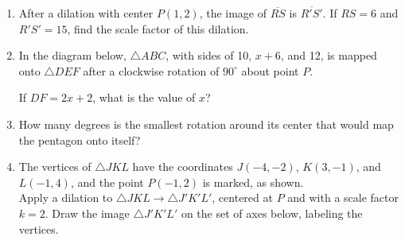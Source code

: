 \documentclass[12pt, twoside]{article}
\begin{document}
\begin{enumerate}
  \item After a dilation with center $P(1,2)$, the image of $\overline{RS}$ is $\overline{R'S'}$. If $RS=6$ and $R'S'=15$, find the scale factor of this dilation. \vspace{3cm}


  \item In the diagram below, $\triangle ABC$, with sides of 10, $x+6$, and 12, is mapped onto $\triangle DEF$ after a clockwise rotation of $90^\circ$ about point $P$.
      \begin{center}
      \end{center}
    If $DF=2x+2$, what is the value of $x$? \vspace{3cm}


     \item How many degrees is the smallest rotation around its center that would map the pentagon onto itself?
       \begin{center}
         \end{center}

\newpage
    \item The vertices of $\triangle JKL$ have the coordinates $J(-4,-2)$, $K(3,-1)$, and $L(-1,4)$, and the point $P(-1,2)$ is marked, as shown. \\[0.25cm]
      Apply a dilation to $\triangle JKL \rightarrow \triangle J'K'L'$, centered at $P$ and with a scale factor $k=2$. Draw the image $\triangle J'K'L'$ on the set of axes below, labeling the vertices.
      \begin{center}
      \end{center}


\end{enumerate}
\end{document}
